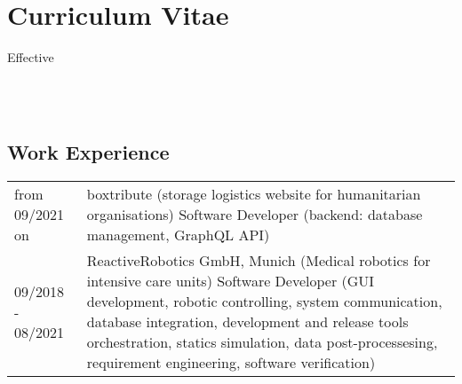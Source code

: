 \documentclass[a4paper,10pt]{memoir}
\begin{document}
\section*{\color{MidnightBlue} Curriculum Vitae}

\begin{flushright}
  Effective \monthname \, \the\year
\end{flushright}


\\
\\

\vspace*{5mm}
\subsection*{Work Experience}
\vspace*{-\baselineskip}
\begin{longtable}{@{}p{} p{}}
  from 09/2021 on &
  boxtribute (storage logistics website for humanitarian organisations) \newline
  Software Developer (backend: database management, GraphQL API)
  \\
  09/2018 - 08/2021 &
  ReactiveRobotics GmbH, Munich (Medical robotics for intensive care units) \newline
  Software Developer (GUI development, robotic controlling, system communication, database integration, development and release tools orchestration, statics simulation, data post-processesing, requirement engineering, software verification)
\end{longtable}
\end{document}
